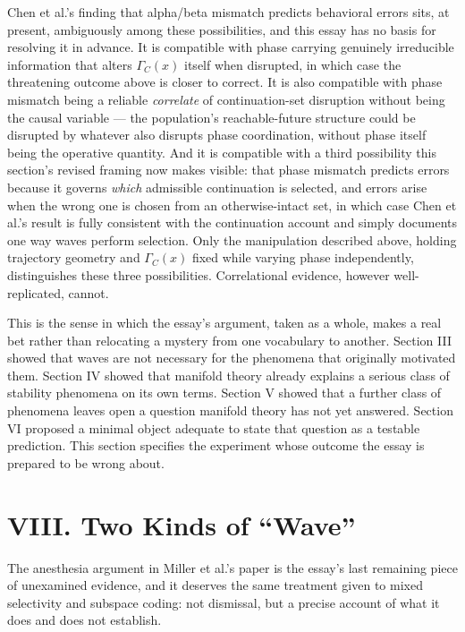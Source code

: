 \documentclass[11pt]{article}
\begin{document}
Chen et al.'s finding that alpha/beta mismatch predicts behavioral errors sits, at present, ambiguously among these possibilities, and this essay has no basis for resolving it in advance. It is compatible with phase carrying genuinely irreducible information that alters $\Gamma_C(x)$ itself when disrupted, in which case the threatening outcome above is closer to correct. It is also compatible with phase mismatch being a reliable \textit{correlate} of continuation-set disruption without being the causal variable — the population's reachable-future structure could be disrupted by whatever also disrupts phase coordination, without phase itself being the operative quantity. And it is compatible with a third possibility this section's revised framing now makes visible: that phase mismatch predicts errors because it governs \textit{which} admissible continuation is selected, and errors arise when the wrong one is chosen from an otherwise-intact set, in which case Chen et al.'s result is fully consistent with the continuation account and simply documents one way waves perform selection. Only the manipulation described above, holding trajectory geometry and $\Gamma_C(x)$ fixed while varying phase independently, distinguishes these three possibilities. Correlational evidence, however well-replicated, cannot.

This is the sense in which the essay's argument, taken as a whole, makes a real bet rather than relocating a mystery from one vocabulary to another. Section III showed that waves are not necessary for the phenomena that originally motivated them. Section IV showed that manifold theory already explains a serious class of stability phenomena on its own terms. Section V showed that a further class of phenomena leaves open a question manifold theory has not yet answered. Section VI proposed a minimal object adequate to state that question as a testable prediction. This section specifies the experiment whose outcome the essay is prepared to be wrong about.
\section*{VIII. Two Kinds of ``Wave''}

The anesthesia argument in Miller et al.'s paper is the essay's last remaining piece of unexamined evidence, and it deserves the same treatment given to mixed selectivity and subspace coding: not dismissal, but a precise account of what it does and does not establish.
\end{document}
